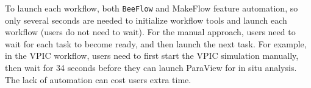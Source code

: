 To launch each workflow, both \texttt{BeeFlow} and MakeFlow feature automation, so only several seconds are needed to initialize workflow tools and launch each workflow (users do not need to wait). For the manual approach, users need to wait for each task to become ready, and then launch the next task. For example, in the VPIC workflow, users need to first start the VPIC simulation manually, then wait for 34 seconds before they can launch ParaView for in situ analysis. The lack of automation can cost users extra time.

